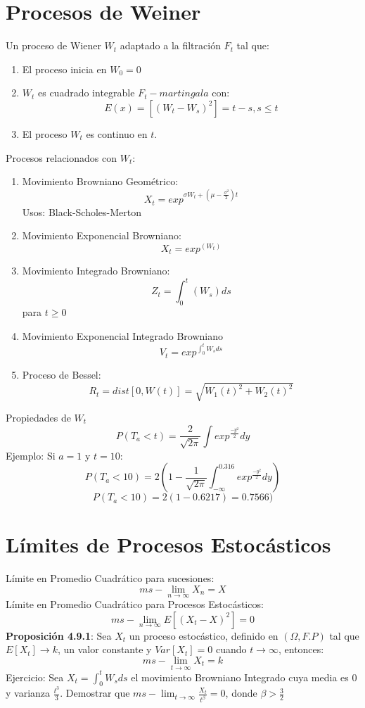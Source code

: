 \documentclass[11pt,fleqn]{book} %
\numberwithin{equation}{section} %
\numberwithin{figure}{section} %
\numberwithin{table}{section} %
\begin{document}
\section{Procesos de Weiner}
Un proceso de Wiener $W_{t}$ adaptado a la filtración $F_t$ tal que:
\begin{enumerate}
    \item El proceso inicia en $W_{0} = 0$
    \item $W_t$ es cuadrado integrable $F_{t}-martingala$ con:
    $$E(x) = [(W_t - W_s)^2] = t - s, s \leq t$$
    \item El proceso $W_t$ es continuo en $t$.
\end{enumerate}
Procesos relacionados con $W_t$:
\begin{enumerate}
    \item Movimiento Browniano Geométrico:
    $$X_t = exp^{\sigma W_{t} + (\mu - {\frac{\sigma^2}{2}})t} $$
    Usos: Black-Scholes-Merton
    \item Movimiento Exponencial Browniano:
    $$X_t = exp^{(W_t)}$$
    \item Movimiento Integrado Browniano:
    $$Z_t = \int_{0}^{t} {(W_s)}ds$$
    para $t\geq 0$
    \item Movimiento Exponencial Integrado Browniano
    $$V_{t} = exp^{\int_{0}^{t} W_{s}ds}$$
    \item Proceso de Bessel:
    $$R_{t} = dist [0, W(t)] = \sqrt{{W_1(t)}^2+{W_2(t)}^2}$$
\end{enumerate}

Propiedades de $W_{t}$
$$P(T_{a} < t) = \frac{2}{\sqrt{2\pi}} \int exp^{\frac{-y^2}{2}}dy $$
Ejemplo: Si $a = 1$ y $t = 10$:
$$P(T_{a} < 10) = 2 (1 - \frac{1}{\sqrt{2\pi}} \int_{-\infty}^{0.316} exp^{\frac{-y^2}{2}}dy ) $$
$$P(T_{a} < 10) = 2 (1 - 0.6217) = 0.7566) $$
\section{Límites de Procesos Estocásticos}
Límite en Promedio Cuadrático para sucesiones:
$$ ms-\lim_{n \to \infty} X_{n} = X$$
Límite en Promedio Cuadrático para Procesos Estocásticos:
$$ ms-\lim_{n \to \infty} E[(X_{t}-X)^2] = 0$$
\textbf{Proposición 4.9.1}: Sea $X_{t}$ un proceso estocástico, definido en $(\Omega,F.P)$ tal que $E[X_{t}] \to k$, un valor constante y $Var[X_{t}] = 0$ cuando $t \to \infty$, entonces:
$$ ms-\lim_{t \to \infty} X_{t} = k $$
Ejercicio: Sea $X_{t} = \int_{0}^{t} W_{s} ds$ el movimiento Browniano Integrado cuya media es $0$ y varianza $\frac{t^{3}}{3}$. Demostrar que $ms-\lim_{t \to \infty} \frac{X_{t}}{t^{\beta}} = 0$, donde $\beta > \frac{3}{2}$
\end{document}
